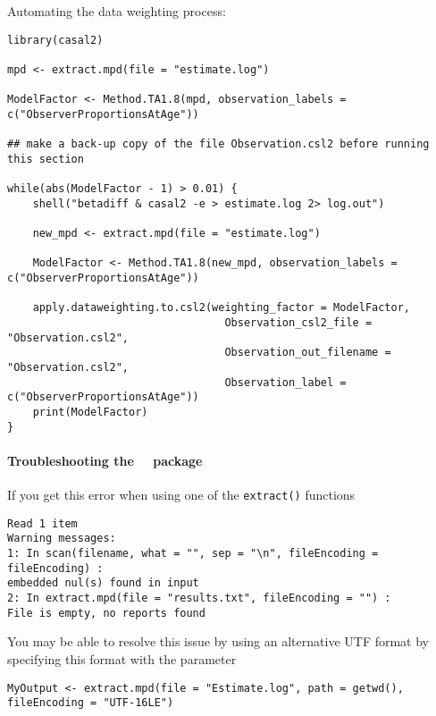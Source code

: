 Automating the data weighting process:

\begin{lstlisting}
library(casal2)

mpd <- extract.mpd(file = "estimate.log")

ModelFactor <- Method.TA1.8(mpd, observation_labels = c("ObserverProportionsAtAge"))

## make a back-up copy of the file Observation.csl2 before running this section

while(abs(ModelFactor - 1) > 0.01) {
	shell("betadiff & casal2 -e > estimate.log 2> log.out")
	
	new_mpd <- extract.mpd(file = "estimate.log")

	ModelFactor <- Method.TA1.8(new_mpd, observation_labels = c("ObserverProportionsAtAge"))
	
	apply.dataweighting.to.csl2(weighting_factor = ModelFactor,
                                  Observation_csl2_file = "Observation.csl2",
                                  Observation_out_filename = "Observation.csl2",
                                  Observation_label = c("ObserverProportionsAtAge"))
	print(ModelFactor)
}
\end{lstlisting}

\paragraph*{Troubleshooting the \cname\ \R\ package}

If you get this error when using one of the \texttt{extract()} functions

\begin{lstlisting}
Read 1 item
Warning messages:
1: In scan(filename, what = "", sep = "\n", fileEncoding = fileEncoding) :
embedded nul(s) found in input
2: In extract.mpd(file = "results.txt", fileEncoding = "") :
File is empty, no reports found
\end{lstlisting}

You may be able to resolve this issue by using an alternative UTF format by specifying this format with the  parameter

\begin{lstlisting}
MyOutput <- extract.mpd(file = "Estimate.log", path = getwd(), fileEncoding = "UTF-16LE")
\end{lstlisting}
